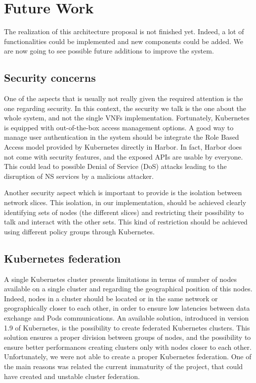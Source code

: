 \chapter{Future Work}
\label{chap:fw}

The realization of this architecture proposal is not finished yet. Indeed, a lot
of functionalities could be implemented and new components could be added. We
are now going to see possible future additions to improve the system.

\section{Security concerns}

One of the aspects that is usually not really given the required attention is
the one regarding security. In this context, the security we talk is the one
about the whole system, and not the single VNFs implementation. Fortunately,
Kubernetes is equipped with out-of-the-box access management options. A good way
to manage user authentication in the system should be integrate the Role Based
Access model provided by Kubernetes directly in Harbor. In fact, Harbor does not
come with security features, and the exposed APIs are usable by everyone. This
could lead to possible Denial of Service (DoS) attacks leading to the disruption
of NS services by a malicious attacker.

Another security aspect which is important to provide is the isolation between
network slices. This isolation, in our implementation, should be achieved
clearly identifying sets of nodes (the different slices) and restricting their
possibility to talk and interact with the other sets. This kind of restriction
should be achieved using different policy groups through Kubernetes.

\section{Kubernetes federation}

A single Kubernetes cluster presents limitations in terms of number of nodes
available on a single cluster and regarding the geographical position of this
nodes. Indeed, nodes in a cluster should be located or in the same network or
geographically closer to each other, in order to ensure low latencies between
data exchange and Pods communications. An available solution, introduced in
version 1.9 of Kubernetes, is the possibility to create federated Kubernetes
clusters. This solution ensures a proper division between groups of nodes, and
the possibility to ensure better performances creating clusters only with nodes
closer to each other. Unfortunately, we were not able to create a proper
Kubernetes federation. One of the main reasons was related the current
immaturity of the project, that could have created and unstable cluster
federation.

